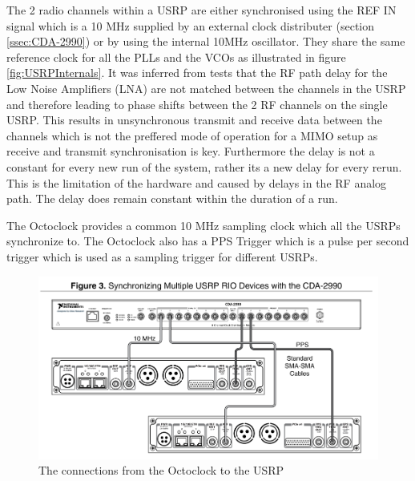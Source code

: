 The 2 radio channels within a USRP are either synchronised using the REF IN signal which is a 10 MHz supplied by an external clock distributer (section \ref{ssec:CDA-2990}) or by using the internal 10MHz oscillator. They share the same reference clock for all the PLLs and the VCOs as illustrated in figure \ref{fig:USRPInternals}. It was inferred from tests that the RF path delay for the Low Noise Amplifiers (LNA) are not matched between the channels in the USRP and therefore leading to phase shifts between the 2 RF channels on the single USRP. This results in unsynchronous transmit and receive data between the channels which is not the preffered mode of operation for a MIMO setup as receive and transmit synchronisation is key. Furthermore the delay is not a constant for every new run of the system, rather its a new delay for every rerun. This is the limitation of the hardware and caused by delays in the RF analog path. The delay does remain constant within the duration of a run.

The Octoclock provides a common 10 MHz sampling clock which all the USRPs synchronize to. The Octoclock also has a PPS Trigger which is a pulse per second trigger which is used as a sampling trigger for different USRPs.

\begin{figure}[h]
    \centering
    \includegraphics[width=\linewidth]{images/USRPHWConnections.png}
    \caption{The connections from the Octoclock to the USRP}
    \label{fig:OctoUSRPConnections}%
\end{figure}

